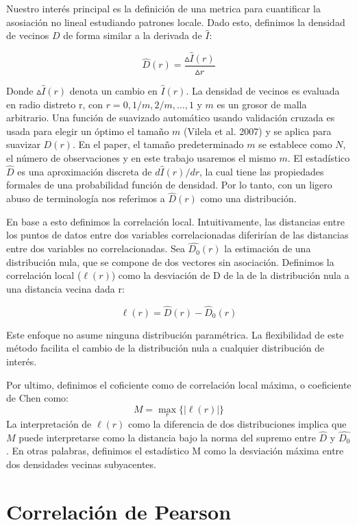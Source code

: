 	Nuestro inter\'es principal es la definici\'on  de una metrica para cuantificar la asosiaci\'on no lineal estudiando patrones locale. Dado esto, definimos la densidad de vecinos $D$ de forma similar a la derivada de $\hat{I}$: 

	$$
		\hat{D}(r)= \frac{\vartriangle\hat{I}(r)}{\vartriangle r}
	$$

	Donde $\vartriangle\hat{I}(r)$ denota un cambio en $\hat{I}(r)$. La densidad de vecinos es evaluada en radio distreto r, con $r=0,1/m, 2/m, \dots, 1$  y $m$ es un grosor de malla arbitrario. Una funci\'on de suavizado autom\'atico usando validaci\'on cruzada es usada para elegir un \'optimo el tama\~no $m$ (Vilela et al. 2007) y se aplica para suavizar $D(r)$. En el paper, el tama\~no predeterminado $m$ se establece como $N$, el n\'umero de observaciones y en este trabajo usaremos el mismo $m$. El estad\'istico $\hat{D}$ es una aproximaci\'on discreta de $d\hat{I}(r)/d r$, la cual tiene las propiedades formales de una probabilidad funci\'on de densidad. Por lo tanto, con un ligero abuso de terminolog\'ia nos referimos a $\widehat{D}(r)$ como una distribuci\'on.

	En base a esto definimos la correlaci\'on local. Intuitivamente, las distancias entre los puntos de datos entre dos variables correlacionadas diferir\'ian de las distancias entre dos variables no correlacionadas. Sea $\widehat{D_0}(r)$ la estimaci\'on de una distribuci\'on nula, que se compone de dos vectores sin asociaci\'on. Definimos la correlaci\'on local ($\ell(r)$) como la desviaci\'on de D de la de la distribuci\'on nula a una distancia vecina dada r:

	$$
		\ell(r)=\widehat{D}(r)-\widehat{D}_{0}(r)
	$$

	Este enfoque no asume ninguna distribuci\'on param\'etrica. La flexibilidad de este m\'etodo facilita el cambio de la distribuci\'on nula a cualquier distribuci\'on de inter\'es. 
	
	Por ultimo, definimos el coficiente como de correlaci\'on local m\'axima, o coeficiente de Chen como:
	$$
		M=\max _{r}\{|\ell(r)|\}
	$$
	La interpretaci\'on de $\ell(r)$ como la diferencia de dos distribuciones implica que $M$ puede interpretarse como la distancia bajo la norma del supremo entre $\widehat{D}$ y $\widehat{D_0}$. En otras palabras, definimos el estad\'istico M como la desviaci\'on m\'axima entre dos densidades vecinas subyacentes.


\section[]{Correlaci\'on de Pearson}

